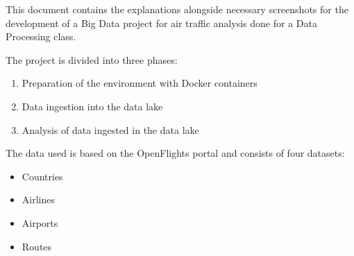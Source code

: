 \par
This document contains the explanations alongside necessary screenshots for the development of a Big Data project for air traffic analysis done for a Data Processing class.

The project is divided into three phases:
\begin{enumerate}
	\item Preparation of the environment with Docker containers
	\item Data ingestion into the data lake
	\item Analysis of data ingested in the data lake
\end{enumerate}

The data used is based on the OpenFlights portal and consists of four datasets:

\begin{itemize}
	\item Countries
	\item Airlines
	\item Airports
	\item Routes
\end{itemize}
